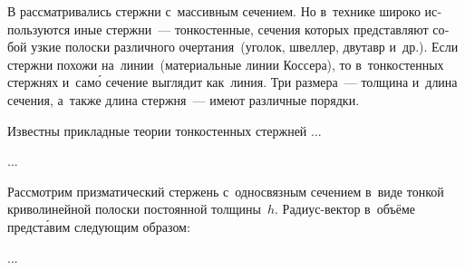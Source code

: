 

\thispagestyle{empty}

\label{chapter:thinwalledrods}



\begin{otherlanguage}{russian}

\lettrine[lines=2, findent=2pt, nindent=0pt]{В}{\hspace{-0.25ex}}  рассматривались стержни с~массивным сечением. Но в~технике широко используются иные стержни~--- тонкостенные, сечения которых представляют собой узкие полоски различного очертания~(уголок, швеллер, двутавр и~др.). Если стержни похожи на~линии~(материальные линии Коссера), то в~тонкостенных стержнях и~сам\'{о} сечение выглядит как~линия. Три размера~--- толщина и~длина сечения, а~также длина стержня~--- имеют различные порядки.

Известны прикладные теории тонкостенных стержней ...

...



\end{otherlanguage}



\begin{otherlanguage}{russian}

Рассмотрим призматический стержень с~односвязным сечением в~виде тонкой криволинейной полоски постоянной толщины~$h$. Радиус\hbox{-}вектор в~объёме предст\'{а}вим следующим образом:

...



\end{otherlanguage}

